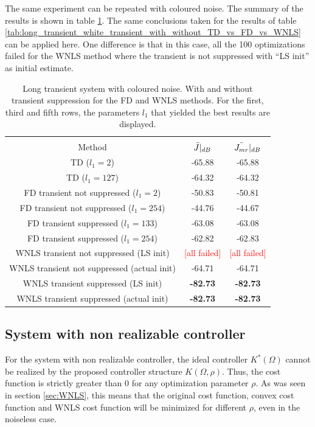 The same experiment can be repeated with coloured noise. The summary of the results is shown in table \ref{tab:long_transient_coloured_transient_with_without_TD_vs_FD_vs_WNLS}. The same conclusions taken for the results of table \ref{tab:long_transient_white_transient_with_without_TD_vs_FD_vs_WNLS} can be applied here. One difference is that in this case, all the 100 optimizations failed for the WNLS method where the transient is not suppressed with ``LS init'' as initial estimate.
\begin{table}[H]
\centering
\begin{tabular}{|ccc|}
\hline
&&\\[-2.5ex]
Method & $\Bar{J}|_{dB}$ & $\Bar{J_{mr}}|_{dB}$ \\
\hline
TD ($l_1 = 2$) & -65.88 & -65.88 \\
TD ($l_1 = 127$) & -64.32 & -64.32 \\
FD transient not suppressed ($l_1 = 2$) & -50.83 & -50.81 \\
FD transient not suppressed ($l_1 = 254$) & -44.76 & -44.67 \\
FD transient suppressed ($l_1 = 133$) & -63.08 & -63.08 \\
FD transient suppressed ($l_1 = 254$) & -62.82 & -62.83 \\
WNLS transient not suppressed (LS init) & \textcolor{red}{[all failed]} & \textcolor{red}{[all failed]}   \\
WNLS transient not suppressed (actual init) & -64.71 & -64.71 \\
WNLS transient suppressed (LS init) & \textbf{-82.73} & \textbf{-82.73} \\
WNLS transient suppressed (actual init) & \textbf{-82.73} & \textbf{-82.73} \\
\hline
\end{tabular}
\caption{Long transient system with coloured noise. With and without transient suppression for the FD and WNLS methods. For the first, third and fifth rows, the parameters $l_1$ that yielded the best results are displayed.}
\label{tab:long_transient_coloured_transient_with_without_TD_vs_FD_vs_WNLS}
\end{table}

\newpage
\subsection{System with non realizable controller}
For the system with non realizable controller, the ideal controller $K^*(\Omega)$ cannot be realized by the proposed controller structure $K(\Omega,\rho)$. Thus, the cost function is strictly greater than 0 for any optimization parameter $\rho$. As was seen in section \ref{sec:WNLS}, this means that the original cost function, convex cost function and WNLS cost function will be minimized for different $\rho$, even in the noiseless case.

